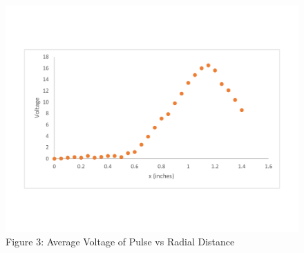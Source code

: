 \documentclass{article}
\begin{document}
\begin{figure}[h]
    \centering
    \includegraphics[width=0.6\linewidth]{Lab2avgvsx.pdf}
    \caption*{{\footnotesize Figure 3: Average Voltage of Pulse vs Radial Distance}}
\end{figure}
\end{document}
